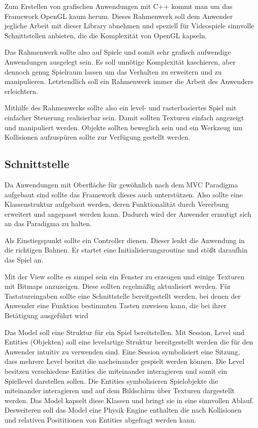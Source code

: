\documentclass[a4paper, 11pt]{article}
\begin{document}
Zum Erstellen von grafischen Anwendungen mit C++ kommt man um das Framework OpenGL kaum herum. Dieses Rahmenwerk soll dem Anwender jegliche Arbeit mit dieser Library abnehmen und speziell für Videospiele sinnvolle Schnittstellen anbieten, die die Komplexität von OpenGL kapseln. 

Das Rahmenwerk sollte also auf Spiele und somit sehr grafisch aufwendige Anwendungen ausgelegt sein. Es soll unnötige Komplexität kaschieren, aber dennoch genug Spielraum lassen um das Verhalten zu erweitern und zu manipulieren. Letztendlich soll ein Rahmenwerk immer die Arbeit des Anwenders erleichtern.

Mithilfe des Rahmenwerks sollte also ein level- und rasterbasiertes Spiel mit einfacher Steuerung realisierbar sein. Damit sollten Texturen einfach angezeigt und manipuliert werden. Objekte sollten beweglich sein und ein Werkzeug um Kollisionen aufzuspüren sollte zur Verfügung gestellt werden. 


\subsection{Schnittstelle}
Da Anwendungen mit Oberfläche für gewöhnlich nach dem MVC Paradigma aufgebaut sind sollte das Framework dieses auch unterstützen. Also sollte eine Klassenstruktur aufgebaut werden, deren Funktionalität durch Vererbung erweitert und angepasst werden kann. Dadurch wird der Anwender ermutigt sich an das Paradigma zu halten. 

Als Einstiegspunkt sollte ein Controller dienen. Dieser lenkt die Anwendung in die richtigen Bahnen. Er startet eine Initialisierungsroutine und stößt daraufhin das Spiel an.

Mit der View sollte es simpel sein ein Fenster zu erzeugen und einige Texturen mit Bitmaps anzuzeigen. Diese sollten regelmäßig aktualisiert werden. Für Tastatureingaben sollte eine Schnittstelle bereitgestellt werden, bei denen der Anwender eine Funktion bestimmten Tasten zuweisen kann, die bei ihrer Betätigung ausgeführt wird

Das Model soll eine Struktur für ein Spiel bereitstellen. Mit Session, Level und Entities (Objekten) soll eine levelartige Struktur bereitgestellt werden die für den Anwender intuitiv zu verwenden sind. Eine Session symbolisiert eine Sitzung, dass mehrere Level besitzt die nacheinander gespielt werden können. Die Level besitzen verschiedene Entities die miteinander interagieren und somit ein Spiellevel darstellen sollen. Die Entities symbolisieren Spielobjekte die miteinander interagieren und auf dem Bildschirm über Texturen dargestellt werden. Das Model kapselt diese Klassen und bringt sie in eine sinnvollen Ablauf. Desweiteren soll das Model eine Physik Engine enthalten die nach Kollisionen und relativen Posititionen von Entities abgefragt werden kann.
\end{document}
